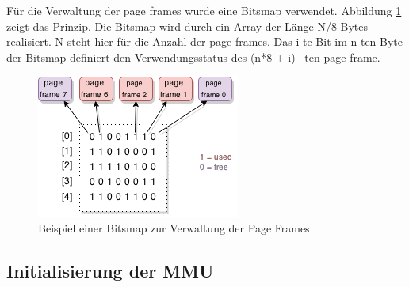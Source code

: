 Für die Verwaltung der page frames wurde eine Bitsmap verwendet. Abbildung \ref{fig:BitsMap} zeigt das Prinzip.
Die Bitsmap wird durch ein Array der Länge N/8 Bytes realisiert. N steht hier für die Anzahl der page frames. Das i-te Bit im n-ten Byte der Bitsmap definiert den Verwendungsstatus des (n*8 + i) –ten page frame.


\begin{figure}[H]
	\centering
	\includegraphics[scale=1]{figures/BitsMap}
	\caption{Beispiel einer Bitsmap zur Verwaltung der Page Frames}
	\label{fig:BitsMap}
\end{figure}

\subsection{Initialisierung der MMU}


\pagebreak 